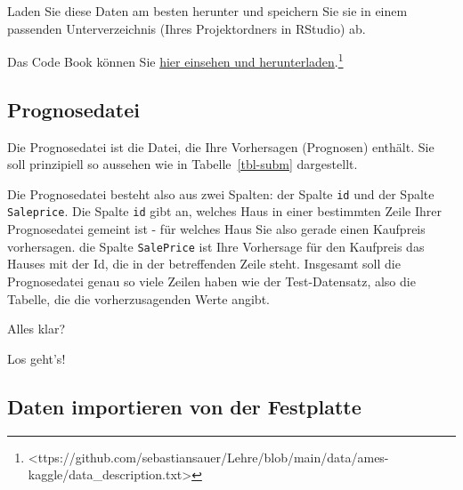 \documentclass[
  letterpaper,
]{scrbook}
\theoremstyle{definition}
\theoremstyle{definition}
\theoremstyle{definition}
\theoremstyle{remark}
\begin{document}
Laden Sie diese Daten am besten herunter und speichern Sie sie in einem
passenden Unterverzeichnis (Ihres Projektordners in RStudio) ab.

Das Code Book können Sie
\href{https://github.com/sebastiansauer/Lehre/blob/main/data/ames-kaggle/data_description.txt}{hier
einsehen und herunterladen}.\footnote{\textless ttps://github.com/sebastiansauer/Lehre/blob/main/data/ames-kaggle/data\_description.txt\textgreater{}}

\subsection{Prognosedatei}\label{prognosedatei}

Die Prognosedatei ist die Datei, die Ihre Vorhersagen (Prognosen)
enthält. Sie soll prinzipiell so aussehen wie in Tabelle~\ref{tbl-subm}
dargestellt.

\begin{table}

\caption{\label{tbl-subm}Beispiel den Aufbau der Prognose-Datei}


\end{table}%

Die Prognosedatei besteht also aus zwei Spalten: der Spalte \texttt{id}
und der Spalte \texttt{Saleprice}. Die Spalte \texttt{id} gibt an,
welches Haus in einer bestimmten Zeile Ihrer Prognosedatei gemeint ist -
für welches Haus Sie also gerade einen Kaufpreis vorhersagen. die Spalte
\texttt{SalePrice} ist Ihre Vorhersage für den Kaufpreis das Hauses mit
der Id, die in der betreffenden Zeile steht. Insgesamt soll die
Prognosedatei genau so viele Zeilen haben wie der Test-Datensatz, also
die Tabelle, die die vorherzusagenden Werte angibt.

Alles klar?

Los geht's!

\subsection{Daten importieren von der
Festplatte}\label{daten-importieren-von-der-festplatte}
\end{document}
